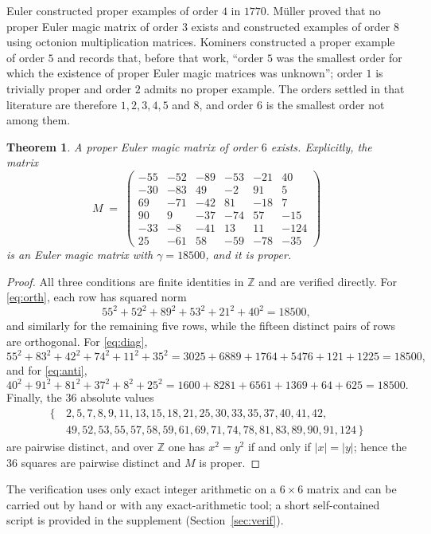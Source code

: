 \documentclass[11pt]{amsart}
\theoremstyle{plain}
\newtheorem{theorem}{Theorem}[section]
\theoremstyle{definition}
\newcommand{\Z}{\mathbb{Z}}
\begin{document}
Euler constructed proper examples of order $4$ in $1770$. M\"uller
\cite{Muller2026} proved that no proper Euler magic matrix of order $3$ exists
and constructed examples of order $8$ using octonion multiplication matrices.
Kominers \cite{Kominers2026} constructed a proper example of order $5$ and
records that, before that work, ``order $5$ was the smallest order for which the
existence of proper Euler magic matrices was unknown''; order $1$ is trivially
proper and order $2$ admits no proper example. The orders settled in that
literature are therefore $1,2,3,4,5$ and $8$, and order $6$ is the smallest order
not among them.

\begin{theorem}\label{thm:main}
A proper Euler magic matrix of order $6$ exists. Explicitly, the matrix
\[
M \;=\;
\begin{pmatrix}
-55 & -52 & -89 & -53 & -21 &  40\\
-30 & -83 &  49 &  -2 &  91 &   5\\
 69 & -71 & -42 &  81 & -18 &   7\\
 90 &   9 & -37 & -74 &  57 & -15\\
-33 &  -8 & -41 &  13 &  11 &-124\\
 25 & -61 &  58 & -59 & -78 & -35
\end{pmatrix}
\]
is an Euler magic matrix with $\gamma=18500$, and it is proper.
\end{theorem}

\begin{proof}
All three conditions are finite identities in $\Z$ and are verified directly.
For \eqref{eq:orth}, each row has squared norm
\[
55^2+52^2+89^2+53^2+21^2+40^2=18500,
\]
and similarly for the remaining five rows, while the fifteen distinct pairs of
rows are orthogonal. For \eqref{eq:diag},
\[
55^2+83^2+42^2+74^2+11^2+35^2 = 3025+6889+1764+5476+121+1225 = 18500 ,
\]
and for \eqref{eq:anti},
\[
40^2+91^2+81^2+37^2+8^2+25^2 = 1600+8281+6561+1369+64+625 = 18500 .
\]
Finally, the $36$ absolute values
\[
\begin{aligned}
\{\,&2,5,7,8,9,11,13,15,18,21,25,30,33,35,37,40,41,42,\\
 &49,52,53,55,57,58,59,61,69,71,74,78,81,83,89,90,91,124\,\}
\end{aligned}
\]
are pairwise distinct, and over $\Z$ one has $x^2=y^2$ if and only if
$|x|=|y|$; hence the $36$ squares are pairwise distinct and $M$ is proper.
\end{proof}

The verification uses only exact integer arithmetic on a $6\times6$ matrix and
can be carried out by hand or with any exact-arithmetic tool; a short
self-contained script is provided in the supplement (Section~\ref{sec:verif}).
\end{document}
